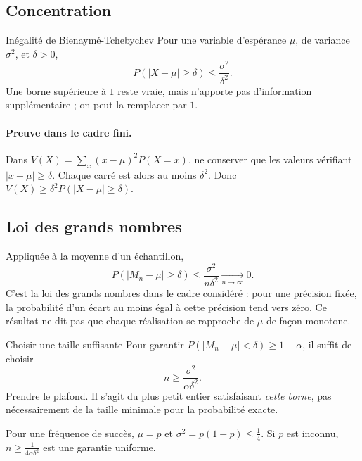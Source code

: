 \subsection{Concentration}
\begin{retenir}{Inégalité de Bienaymé-Tchebychev}
Pour une variable d'espérance $\mu$, de variance $\sigma^2$, et $\delta>0$,
\[P(|X-\mu|\ge\delta)\le\frac{\sigma^2}{\delta^2}.\]
Une borne supérieure à $1$ reste vraie, mais n'apporte pas d'information supplémentaire ; on peut la remplacer par $1$.
\end{retenir}
\paragraph{Preuve dans le cadre fini.} Dans $V(X)=\sum_x(x-\mu)^2P(X=x)$, ne conserver que les valeurs vérifiant $|x-\mu|\ge\delta$. Chaque carré est alors au moins $\delta^2$. Donc $V(X)\ge\delta^2P(|X-\mu|\ge\delta)$.
\subsection{Loi des grands nombres}
Appliquée à la moyenne d'un échantillon,
\[P(|M_n-\mu|\ge\delta)\le\frac{\sigma^2}{n\delta^2}\xrightarrow[n\to\infty]{}0.\]
C'est la loi des grands nombres dans le cadre considéré : pour une précision fixée, la probabilité d'un écart au moins égal à cette précision tend vers zéro. Ce résultat ne dit pas que chaque réalisation se rapproche de $\mu$ de façon monotone.
\begin{methode}{Choisir une taille suffisante}
Pour garantir $P(|M_n-\mu|<\delta)\ge1-\alpha$, il suffit de choisir
\[n\ge\frac{\sigma^2}{\alpha\delta^2}.\]
Prendre le plafond. Il s'agit du plus petit entier satisfaisant \emph{cette borne}, pas nécessairement de la taille minimale pour la probabilité exacte.
\end{methode}
Pour une fréquence de succès, $\mu=p$ et $\sigma^2=p(1-p)\le\frac{1}{4}$. Si $p$ est inconnu, $n\ge\frac{1}{4\alpha\delta^2}$ est une garantie uniforme.


